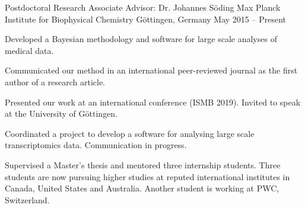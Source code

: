 


\begin{cventries}


\cventry
{Postdoctoral Research Associate \quad\textbar\quad Advisor: Dr. Johannes S{\"o}ding} %
{Max Planck Institute for Biophysical Chemistry} %
{G{\"o}ttingen, Germany} %
{May 2015 -- Present} %
{ %
\begin{cvitems}
\item {Developed a Bayesian methodology and software for large scale analyses of medical data.}
\item {Communicated our method in an international peer-reviewed journal as the first author of a research article.}
\item {Presented our work at an international conference (ISMB 2019). Invited to speak at the University of G{\"o}ttingen.}
\item {Coordinated a project to develop a software for analysing large scale transcriptomics data. Communication in progress.}
\item {Supervised a Master's thesis and mentored three internship students. Three students are now pursuing higher studies at reputed international institutes in Canada, United States and Australia. Another student is working at PWC, Switzerland.}
\end{cvitems}
}


\end{cventries}
